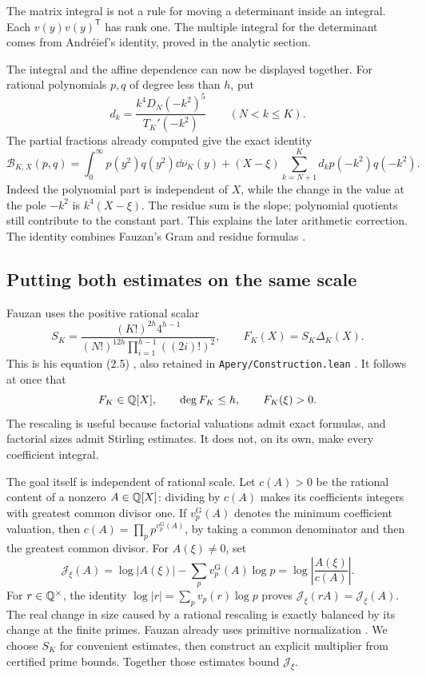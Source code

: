 The matrix integral is not a rule for moving a determinant inside an
integral. Each $v(y)v(y)^{\mathsf T}$ has rank one. The multiple integral
for the determinant comes from Andr\'eief's identity, proved in the analytic section.

The integral and the affine dependence can now be displayed together.
For rational polynomials \(p,q\) of degree less than \(h\), put
\[
 d_k=\frac{k^4D_N(-k^2)^5}{T_K'(-k^2)}
 \qquad(N<k\le K).
\]
The partial fractions already computed give the exact identity
\begin{equation}\label{eq:gram-residue}
 \mathcal B_{K,X}(p,q)
 =\int_0^\infty p(y^2)q(y^2)\dd\nu_K(y)
 +(X-\xi)\sum_{k=N+1}^K d_kp(-k^2)q(-k^2).
\end{equation}
Indeed the polynomial part is independent of \(X\), while the change
in the value at the pole \(-k^2\) is \(k^4(X-\xi)\).
The residue sum is the slope; polynomial quotients still contribute to
the constant part. This explains the later arithmetic correction.
The identity combines Fauzan's Gram and residue formulas
\cite[Sections 2.3--2.4]{fauzan}.

\subsection{Putting both estimates on the same scale}
Fauzan uses the positive rational scalar
\begin{equation}\label{eq:normalization}
 S_K=\frac{(K!)^{2h}4^{h-1}}
 {(N!)^{12h}\prod_{i=1}^{h-1}((2i)!)^2},
 \qquad F_K(X)=S_K\Delta_K(X).
\end{equation}
This is his equation (2.5) \cite{fauzan}, also retained in
\texttt{Apery/Construction.lean} \cite{firsching}.
It follows at once that
\[
 F_K\in\mathbb Q[X],\qquad \deg F_K\leq h,\qquad F_K(\xi)>0.
\]
The rescaling is useful because factorial valuations admit exact formulas,
and factorial sizes admit Stirling estimates. It does not, on its own,
make every coefficient integral.

The goal itself is independent of rational scale. Let \(c(A)>0\)
be the rational content of a nonzero \(A\in\mathbb Q[X]\): dividing by \(c(A)\)
makes its coefficients integers with greatest common divisor one.
If \(v_p^{\mathrm G}(A)\) denotes the minimum coefficient valuation,
then \(c(A)=\prod_p p^{v_p^{\mathrm G}(A)}\), by taking a common
denominator and then the greatest common divisor. For \(A(\xi)\ne0\), set
\begin{equation}\label{eq:primitive-size}
 \mathcal J_\xi(A)
 =\log|A(\xi)|-\sum_p v_p^{\mathrm G}(A)\log p
 =\log\left|\frac{A(\xi)}{c(A)}\right|.
\end{equation}
For \(r\in\mathbb Q^\times\), the identity
\(\log|r|=\sum_p v_p(r)\log p\) proves
\(\mathcal J_\xi(rA)=\mathcal J_\xi(A)\).
The real change in size caused by a rational rescaling is exactly
balanced by its change at the finite primes.
Fauzan already uses primitive normalization
\cite[Appendix C.3]{fauzan}. We choose \(S_K\) for convenient estimates,
then construct an explicit multiplier from certified prime bounds.
Together those estimates bound \(\mathcal J_\xi\).
